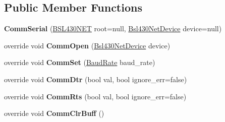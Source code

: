 \subsection*{Public Member Functions}
\begin{DoxyCompactItemize}
\item 
\mbox{\label{class_b_s_l430___n_e_t_1_1_comm_1_1_comm_serial_a5a282e4fe678f1310980741a11d0a89a}} 
{\bfseries Comm\+Serial} (\mbox{\hyperlink{class_b_s_l430___n_e_t_1_1_b_s_l430_n_e_t}{B\+S\+L430\+N\+ET}} root=null, \mbox{\hyperlink{class_b_s_l430___n_e_t_1_1_bsl430_net_device}{Bsl430\+Net\+Device}} device=null)
\item 
\mbox{\label{class_b_s_l430___n_e_t_1_1_comm_1_1_comm_serial_a0d59c6a17da09ccb651221c9f5ba8c10}} 
override void {\bfseries Comm\+Open} (\mbox{\hyperlink{class_b_s_l430___n_e_t_1_1_bsl430_net_device}{Bsl430\+Net\+Device}} device)
\item 
\mbox{\label{class_b_s_l430___n_e_t_1_1_comm_1_1_comm_serial_a5cca331a5142c8af221e9353c071f2d9}} 
override void {\bfseries Comm\+Set} (\mbox{\hyperlink{namespace_b_s_l430___n_e_t_a8d30c263598635a481840944d38aeb70}{Baud\+Rate}} baud\+\_\+rate)
\item 
\mbox{\label{class_b_s_l430___n_e_t_1_1_comm_1_1_comm_serial_ac1898b4069a4ef0d732ced834e3b3643}} 
override void {\bfseries Comm\+Dtr} (bool val, bool ignore\+\_\+err=false)
\item 
\mbox{\label{class_b_s_l430___n_e_t_1_1_comm_1_1_comm_serial_a99578944b1a49d622bb20a364be713e6}} 
override void {\bfseries Comm\+Rts} (bool val, bool ignore\+\_\+err=false)
\item 
\mbox{\label{class_b_s_l430___n_e_t_1_1_comm_1_1_comm_serial_a59766a542d6d1ee488031044824a45c0}} 
override void {\bfseries Comm\+Clr\+Buff} ()
\item 
\mbox{\label{class_b_s_l430___n_e_t_1_1_comm_1_1_comm_serial_a35f2766e34914fbbb7d02b62f52ee610}} 

\end{DoxyCompactItemize}
